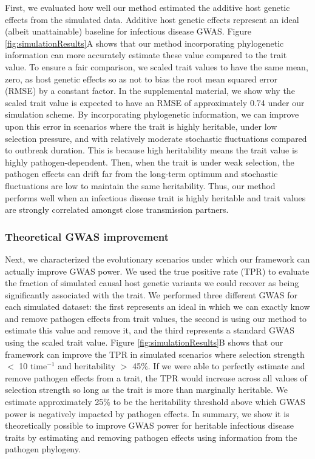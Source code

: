 \documentclass[11pt]{article}
\begin{document}
\begin{linenumbers}
First, we evaluated how well our method estimated the additive host genetic effects from the simulated data. Additive host genetic effects represent an ideal (albeit unattainable) baseline for infectious disease GWAS. Figure \ref{fig:simulationResults}A shows that our method incorporating phylogenetic information can more accurately estimate these value compared to the trait value. To ensure a fair comparison, we scaled trait values to have the same mean, zero, as host genetic effects so as not to bias the root mean squared error (RMSE) by a constant factor. In the supplemental material, we show why the scaled trait value is expected to have an RMSE of approximately 0.74 under our simulation scheme. By incorporating phylogenetic information, we can improve upon this error in scenarios where the trait is highly heritable, under low selection pressure, and with relatively moderate stochastic fluctuations compared to outbreak duration. This is because high heritability means the trait value is highly pathogen-dependent. Then, when the trait is under weak selection, the pathogen effects can drift far from the long-term optimum and stochastic fluctuations are low to maintain the same heritability. Thus, our method performs well when an infectious disease trait is highly heritable and trait values are strongly correlated amongst close transmission partners.

\subsubsection*{Theoretical GWAS improvement}

Next, we characterized the evolutionary scenarios under which our framework can actually improve GWAS power. We used the true positive rate (TPR) to evaluate the fraction of simulated causal host genetic variants we could recover as being significantly associated with the trait. We performed three different GWAS for each simulated dataset: the first represents an ideal in which we can exactly know and remove pathogen effects from trait values, the second is using our method to estimate this value and remove it, and the third represents a standard GWAS using the scaled trait value. Figure \ref{fig:simulationResults}B shows that our framework can improve the TPR in simulated scenarios where selection strength $<$ 10 time$^{-1}$ and heritability $>$ 45\%. If we were able to perfectly estimate and remove pathogen effects from a trait, the TPR would increase across all values of selection strength so long as the trait is more than marginally heritable. We estimate approximately 25\% to be the heritability threshold above which GWAS power is negatively impacted by pathogen effects. In summary, we show it is theoretically possible to improve GWAS power for heritable infectious disease traits by estimating and removing pathogen effects using information from the pathogen phylogeny.


\end{linenumbers}
\end{document}
